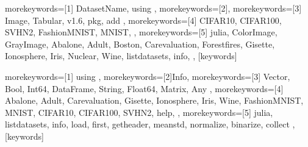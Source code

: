 {%
morekeywords=[1]{
    DatasetName, using%
},%
morekeywords=[2]{},%
morekeywords=[3]{
    Image, Tabular, v1.6, pkg, add
},
morekeywords=[4]{
    CIFAR10, CIFAR100, SVHN2, FashionMNIST, MNIST,
},
morekeywords=[5]{
    julia,
    ColorImage, GrayImage, Abalone, Adult, Boston, Carevaluation, Forestfires,
    Gisette, Ionosphere, Iris, Nuclear, Wine,
    listdatasets, info,
},
}[keywords]

{%
morekeywords=[1]{
    using
},%
morekeywords=[2]{Info},%
morekeywords=[3]{
    Vector, Bool, Int64, DataFrame, String, Float64, Matrix, Any
},
morekeywords=[4]{
    Abalone, Adult, Carevaluation, Gisette, Ionosphere, Iris, Wine, FashionMNIST, MNIST, CIFAR10, CIFAR100, SVHN2, help,
},
morekeywords=[5]{
    julia, listdatasets, info, load, first, getheader, meanstd, normalize, binarize, collect
},
}[keywords]